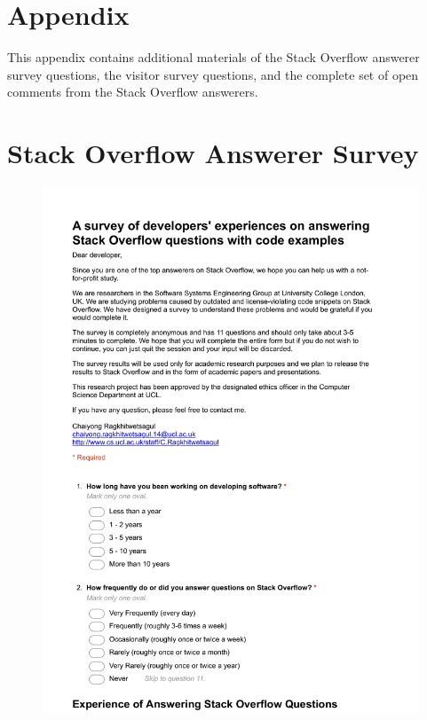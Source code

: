 \documentclass{svjour3}                     %
\begin{document}
%
%

 

\clearpage
\section{Appendix}

This appendix contains additional materials of the Stack Overflow answerer survey questions, the visitor survey questions, and the complete set of open comments from the Stack Overflow answerers.

\clearpage

\appendix
\section{Stack Overflow Answerer Survey}\label{appendixA}
\begin{figure}[H]
	\centering
	\includegraphics[width=0.8\linewidth]{answerer-1}
	\label{fig:answerer-1}
\end{figure}
\end{document}

